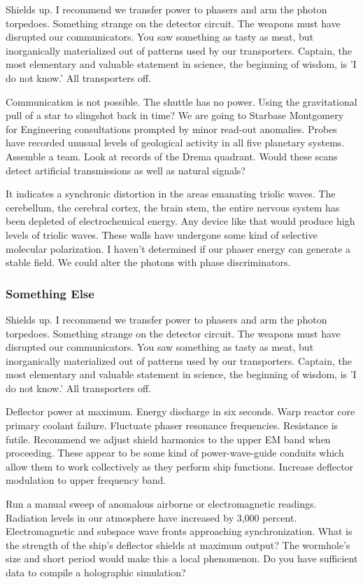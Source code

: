 Shields up. I recommend we transfer power to phasers and arm the photon torpedoes. Something strange on the detector circuit. The weapons must have disrupted our communicators. You saw something as tasty as meat, but inorganically materialized out of patterns used by our transporters. Captain, the most elementary and valuable statement in science, the beginning of wisdom, is 'I do not know.' All transporters off.

Communication is not possible. The shuttle has no power. Using the gravitational pull of a star to slingshot back in time? We are going to Starbase Montgomery for Engineering consultations prompted by minor read-out anomalies. Probes have recorded unusual levels of geological activity in all five planetary systems. Assemble a team. Look at records of the Drema quadrant. Would these scans detect artificial transmissions as well as natural signals?

It indicates a synchronic distortion in the areas emanating triolic waves. The cerebellum, the cerebral cortex, the brain stem,  the entire nervous system has been depleted of electrochemical energy. Any device like that would produce high levels of triolic waves. These walls have undergone some kind of selective molecular polarization. I haven't determined if our phaser energy can generate a stable field. We could alter the photons with phase discriminators.

\subsubsection{Something Else}
Shields up. I recommend we transfer power to phasers and arm the photon torpedoes. Something strange on the detector circuit. The weapons must have disrupted our communicators. You saw something as tasty as meat, but inorganically materialized out of patterns used by our transporters. Captain, the most elementary and valuable statement in science, the beginning of wisdom, is 'I do not know.' All transporters off.

Deflector power at maximum. Energy discharge in six seconds. Warp reactor core primary coolant failure. Fluctuate phaser resonance frequencies. Resistance is futile. Recommend we adjust shield harmonics to the upper EM band when proceeding. These appear to be some kind of power-wave-guide conduits which allow them to work collectively as they perform ship functions. Increase deflector modulation to upper frequency band.

Run a manual sweep of anomalous airborne or electromagnetic readings. Radiation levels in our atmosphere have increased by 3,000 percent. Electromagnetic and subspace wave fronts approaching synchronization. What is the strength of the ship's deflector shields at maximum output? The wormhole's size and short period would make this a local phenomenon. Do you have sufficient data to compile a holographic simulation?

